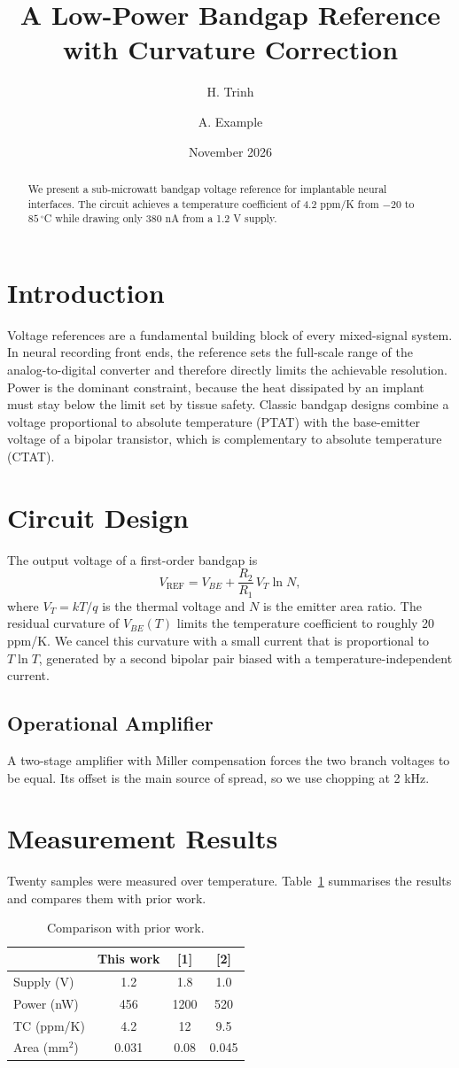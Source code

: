 \documentclass[10pt,twocolumn]{article}
\title{A Low-Power Bandgap Reference with Curvature Correction}
\author{H. Trinh \and A. Example}
\date{November 2026}
\begin{document}
\maketitle
\begin{abstract}
We present a sub-microwatt bandgap voltage reference for implantable neural interfaces.
The circuit achieves a temperature coefficient of 4.2 ppm/K from $-20$ to $85\,^\circ$C
while drawing only 380 nA from a 1.2 V supply.
\end{abstract}
\section{Introduction}
Voltage references are a fundamental building block of every mixed-signal system.
In neural recording front ends, the reference sets the full-scale range of the
analog-to-digital converter and therefore directly limits the achievable
resolution. Power is the dominant constraint, because the heat dissipated by
an implant must stay below the limit set by tissue safety.
Classic bandgap designs combine a voltage proportional to absolute temperature
(PTAT) with the base-emitter voltage of a bipolar transistor, which is
complementary to absolute temperature (CTAT).
\section{Circuit Design}
The output voltage of a first-order bandgap is
\begin{equation}
V_{\mathrm{REF}} = V_{BE} + \frac{R_2}{R_1}\, V_T \ln N ,
\end{equation}
where $V_T = kT/q$ is the thermal voltage and $N$ is the emitter area ratio.
The residual curvature of $V_{BE}(T)$ limits the temperature coefficient to
roughly 20 ppm/K. We cancel this curvature with a small current that is
proportional to $T \ln T$, generated by a second bipolar pair biased with a
temperature-independent current.
\subsection{Operational Amplifier}
A two-stage amplifier with Miller compensation forces the two branch voltages to
be equal. Its offset is the main source of spread, so we use chopping at 2 kHz.
\section{Measurement Results}
Twenty samples were measured over temperature. Table~\ref{tab:res} summarises
the results and compares them with prior work.
\begin{table}[h]
\centering
\begin{tabular}{lccc}
\hline
 & This work & [1] & [2] \\
\hline
Supply (V) & 1.2 & 1.8 & 1.0 \\
Power (nW) & 456 & 1200 & 520 \\
TC (ppm/K) & 4.2 & 12 & 9.5 \\
Area (mm$^2$) & 0.031 & 0.08 & 0.045 \\
\hline
\end{tabular}
\caption{Comparison with prior work.}
\label{tab:res}
\end{table}
\end{document}
